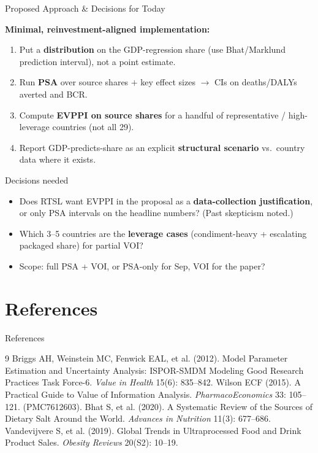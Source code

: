 \documentclass[
  11pt,
  ignorenonframetext,
  aspectratio=169]{beamer}
\begin{document}
\begin{frame}{Proposed Approach \& Decisions for Today}
\label{proposed-approach-decisions-for-today}
\justifying
\footnotesize

\textbf{Minimal, reinvestment-aligned implementation:}

\begin{enumerate}
  \item Put a \textbf{distribution} on the GDP-regression share (use Bhat/Marklund prediction interval), not a point estimate.
  \item Run \textbf{PSA} over source shares $+$ key effect sizes $\to$ CIs on deaths/DALYs averted and BCR.
  \item Compute \textbf{EVPPI on source shares} for a handful of representative / high-leverage countries (not all 29).
  \item Report GDP-predicts-share as an explicit \textbf{structural scenario} vs.\ country data where it exists.
\end{enumerate}

\medskip
\begin{alertblock}{Decisions needed}
\footnotesize
\begin{itemize}
  \item Does RTSL want EVPPI in the proposal as a \textbf{data-collection justification}, or only PSA intervals on the headline numbers? (Past skepticism noted.)
  \item Which 3--5 countries are the \textbf{leverage cases} (condiment-heavy + escalating packaged share) for partial VOI?
  \item Scope: full PSA + VOI, or PSA-only for Sep, VOI for the paper?
\end{itemize}
\end{alertblock}
\end{frame}

\section{References}\label{references}

\begin{frame}{References}
\label{references-1}
\tiny

\begin{thebibliography}{9}
 Briggs AH, Weinstein MC, Fenwick EAL, et al. (2012). Model Parameter Estimation and Uncertainty Analysis: ISPOR-SMDM Modeling Good Research Practices Task Force-6. \emph{Value in Health} 15(6): 835--842.
 Wilson ECF (2015). A Practical Guide to Value of Information Analysis. \emph{PharmacoEconomics} 33: 105--121. (PMC7612603).
 Bhat S, et al. (2020). A Systematic Review of the Sources of Dietary Salt Around the World. \emph{Advances in Nutrition} 11(3): 677--686.
 Vandevijvere S, et al. (2019). Global Trends in Ultraprocessed Food and Drink Product Sales. \emph{Obesity Reviews} 20(S2): 10--19.
\end{thebibliography}
\end{frame}
\end{document}
